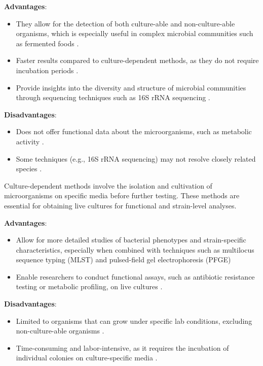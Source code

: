 \textbf{Advantages}:
\begin{itemize}
    \item They allow for the detection of both culture-able and non-culture-able organisms, which is especially useful in complex microbial communities such as fermented foods \cite*{L3-SeqBasedClass,L5-HighThroughput}.
    \item Faster results compared to culture-dependent methods, as they do not require incubation periods \cite*{L5-DNAEnrichment}.
    \item Provide insights into the diversity and structure of microbial communities through sequencing techniques such as 16S rRNA sequencing \cite*{L3-SeqBasedClass}.
\end{itemize}

\textbf{Disadvantages}:
\begin{itemize}
    \item Does not offer functional data about the microorganisms, such as metabolic activity \cite*{L5-HighThroughput,L3-SeqBasedClass}.
    \item Some techniques (e.g., 16S rRNA sequencing) may not resolve closely related species \cite*{L5-HighThroughput}.
\end{itemize}

Culture-dependent methods involve the isolation and cultivation of microorganisms on specific media before further testing. These methods are essential for obtaining live cultures for functional and strain-level analyses.

\textbf{Advantages}:
\begin{itemize}
    \item Allow for more detailed studies of bacterial phenotypes and strain-specific characteristics, especially when combined with techniques such as multilocus sequence typing (MLST) and pulsed-field gel electrophoresis (PFGE) \cite*{L5-DNAEnrichment}
    \item Enable researchers to conduct functional assays, such as antibiotic resistance testing or metabolic profiling, on live cultures \cite*{L3-SeqBasedClass}.
\end{itemize}

\textbf{Disadvantages}:
\begin{itemize}
    \item Limited to organisms that can grow under specific lab conditions, excluding non-culture-able organisms \cite*{L5-HighThroughput}.
    \item Time-consuming and labor-intensive, as it requires the incubation of individual colonies on culture-specific media \cite*{L5-DNAEnrichment}.
\end{itemize}


